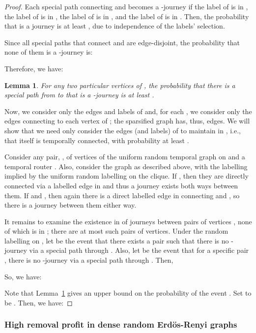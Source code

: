 \documentclass[a4paper,UKenglish]{article}
\newtheorem{lemma}{Lemma}
\begin{document}
\begin{proof}
Each special path  connecting  and  becomes a -journey if the label  of  is in , the label  of  is in , the label  of  is in , and the label  of  is in . Then, the probability that  is a journey is at least , due to independence of the labels' selection.

Since all special paths that connect  and  are edge-disjoint, the probability that none of them is a -journey is:


Therefore, we have:
\begin{lemma}\label{lem:no_journey}
For any two particular vertices  of , the probability that there is a special path  from  to  that is a -journey is at least .
\end{lemma}

Now, we consider only the edges and labels of  and, for each , we consider only the edges connecting  to each vertex of ; the sparsified graph  has, thus,  edges. We will show that we need only consider the edges (and labels) of  to maintain  in , i.e., that  itself is temporally connected, with probability at least .

Consider any pair, , of vertices of the uniform random temporal graph on  and a temporal router . Also, consider the graph  as described above, with the labelling implied by the uniform random labelling on the clique. If , then they are directly connected via a labelled edge in  and thus a journey exists both ways between them. If  and , then again there is a direct labelled edge in  connecting  and , so there is a journey between them either way.

It remains to examine the existence in  of journeys between pairs of vertices , none of which is in ; there are at most  such pairs of vertices. Under the random labelling on , let  be the event that there exists a pair  such that there is no -journey via a special path through . Also, let  be the event that for a specific pair , there is no -journey via a special path through . Then,


So, we have:


Note that Lemma~\ref{lem:no_journey} gives an upper bound on the probability of the event . Set  to be . Then, we have:


\end{proof}



\subsubsection{High removal profit in dense random Erd\"os-Renyi graphs}
\end{document}
